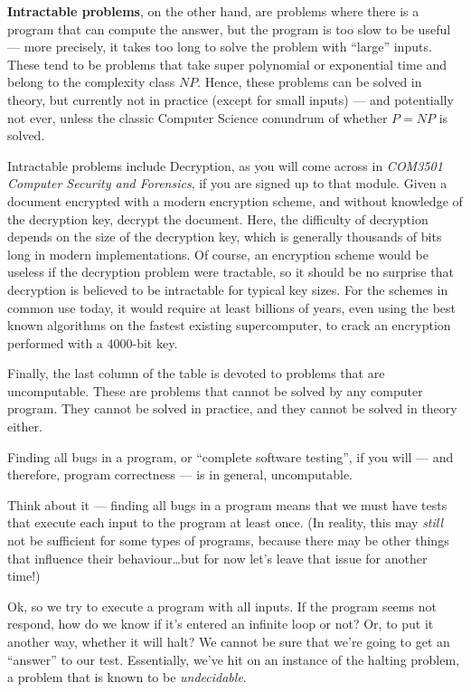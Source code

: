 {\bf Intractable problems}, on the other hand, are problems where there is a
program that can compute the answer, but the program is too slow to be useful
--- more precisely, it takes too long to solve the problem with ``large''
inputs. These tend to be problems that take super polynomial or exponential time
and belong to the complexity class $\mathit{NP}$. Hence, these problems can be
solved in theory, but currently not in practice (except for small inputs) ---
and potentially not ever, unless the classic Computer Science conundrum of
whether $P = NP$ is solved. 

Intractable problems include Decryption, as you will come across in {\it COM3501
Computer Security and Forensics}, if you are signed up to that module. Given a
document encrypted with a modern encryption scheme, and without knowledge of the
decryption key, decrypt the document. Here, the difficulty of decryption depends
on the size of the decryption key, which is generally thousands of bits long in
modern implementations. Of course, an encryption scheme would be useless if the
decryption problem were tractable, so it should be no surprise that decryption
is believed to be intractable for typical key sizes. For the schemes in common
use today, it would require at least billions of years, even using the best
known algorithms on the fastest existing supercomputer, to crack an encryption
performed with a 4000-bit key. 

Finally, the last column of the table is devoted to problems that are
uncomputable. These are problems that cannot be solved by any computer program.
They cannot be solved in practice, and they cannot be solved in theory either.

Finding all bugs in a program, or ``complete software testing'', if you will ---
and therefore, program correctness --- is in general, uncomputable. 

Think about it --- finding all bugs in a program means that we must have tests
that execute each input to the program at least once. (In reality, this may {\it
still} not be sufficient for some types of programs, because there may be other
things that influence their behaviour\dots but for now let's leave that issue
for another time!)

Ok, so we try to execute a program with all inputs. If the program seems not
respond, how do we know if it's entered an infinite loop or not? Or, to put it
another way, whether it will halt? We cannot be sure that we're going to get an
``answer'' to our test. Essentially, we've hit on an instance of the halting
problem, a problem that is known to be {\it undecidable}.


